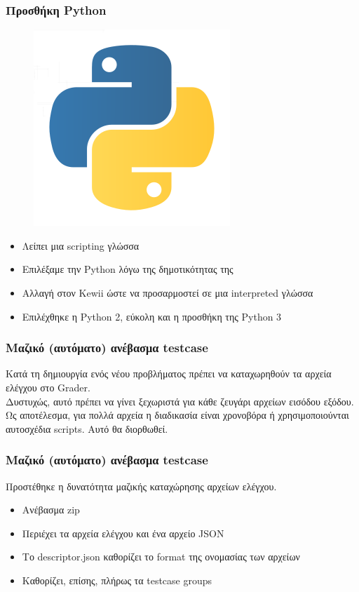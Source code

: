 \documentclass{beamer}
\begin{document}
\begin{frame}
  \frametitle{Προσθήκη Python}

  \begin{figure}
    \includegraphics[scale=0.4]{../Figures/python.png}
  \end{figure}

  \begin{itemize}
      \item Λείπει μια scripting γλώσσα
      \item Επιλέξαμε την Python λόγω της δημοτικότητας της
      \item Αλλαγή στον Kewii ώστε να προσαρμοστεί σε μια interpreted γλώσσα
      \item Επιλέχθηκε η Python 2, εύκολη και η προσθήκη της Python 3
  \end{itemize}
\end{frame}

\begin{frame}
  \frametitle{Μαζικό (αυτόματο) ανέβασμα testcase}

   Κατά τη δημιουργία ενός νέου προβλήματος πρέπει να καταχωρηθούν τα αρχεία
   ελέγχου στο Grader. \\[0.3cm]

   Δυστυχώς, αυτό πρέπει να γίνει ξεχωριστά για κάθε ζευγάρι αρχείων εισόδου
   εξόδου. \\[0.3cm]

   Ως αποτέλεσμα, για πολλά αρχεία η διαδικασία είναι χρονοβόρα ή χρησιμοποιούνται
   αυτοσχέδια scripts. Αυτό θα διορθωθεί.
\end{frame}

\begin{frame}
  \frametitle{Μαζικό (αυτόματο) ανέβασμα testcase}

  Προστέθηκε η δυνατότητα μαζικής καταχώρησης αρχείων ελέγχου.

  \begin{itemize}
      \item Ανέβασμα zip
      \item Περιέχει τα αρχεία ελέγχου και ένα αρχείο JSON
      \item Το descriptor.json καθορίζει το format της ονομασίας των αρχείων
      \item Καθορίζει, επίσης, πλήρως τα testcase groups
  \end{itemize}
\end{frame}
\end{document}
